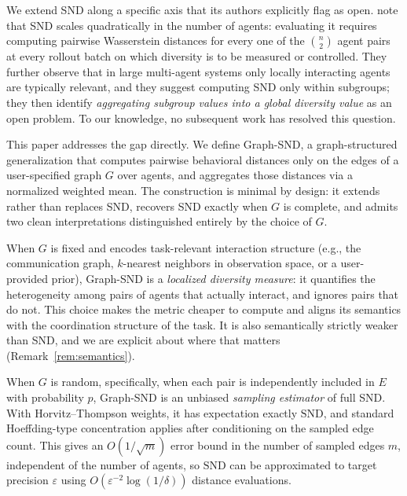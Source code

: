 \documentclass[11pt]{article}
\theoremstyle{plain}
\theoremstyle{definition}
\theoremstyle{remark}
\newcommand{\SND}{\ensuremath{\mathrm{SND}}}
\begin{document}
We extend SND along a specific axis that its authors explicitly flag
as open.
\citet[\S 6]{bettini2025snd}
note that SND scales quadratically in the number of agents: evaluating
it requires computing pairwise Wasserstein distances for every one of
the $\binom{n}{2}$ agent pairs at every rollout batch on which
diversity is to be measured or controlled. They further observe that
in large multi-agent systems only locally interacting agents are
typically relevant, and they suggest computing SND only within
subgroups; they then identify \emph{aggregating subgroup values into a
global diversity value} as an open problem. To our knowledge, no
subsequent work has resolved this question.

This paper addresses the gap directly. We define Graph-SND, a
graph-structured generalization that computes pairwise behavioral
distances only on the edges of a user-specified graph $G$ over agents,
and aggregates those distances via a normalized weighted mean. The
construction is minimal by design: it extends rather than replaces
SND, recovers SND exactly when $G$ is complete, and admits two clean
interpretations distinguished entirely by the choice of $G$.

When $G$ is fixed and encodes task-relevant interaction structure
(e.g., the communication graph, $k$-nearest neighbors in observation
space, or a user-provided prior), Graph-SND is a \emph{localized
diversity measure}: it quantifies the heterogeneity among pairs of
agents that actually interact, and ignores pairs that do not. This
choice makes the metric cheaper to compute and aligns its semantics
with the coordination structure of the task. It is also semantically
strictly weaker than SND, and we are explicit about where that matters
(Remark~\ref{rem:semantics}).

When $G$ is random, specifically, when each pair is independently
included in $E$ with probability $p$, Graph-SND is an unbiased
\emph{sampling estimator} of full SND. With Horvitz--Thompson weights,
it has expectation exactly $\SND$, and standard Hoeffding-type
concentration applies after conditioning on the sampled edge count.
This gives an $O(1/\sqrt{m})$ error bound in the number of sampled edges $m$, independent of the number of agents, so $\SND$ can be
approximated to target precision $\varepsilon$ using
$O(\varepsilon^{-2} \log(1/\delta))$ distance evaluations.
\end{document}
